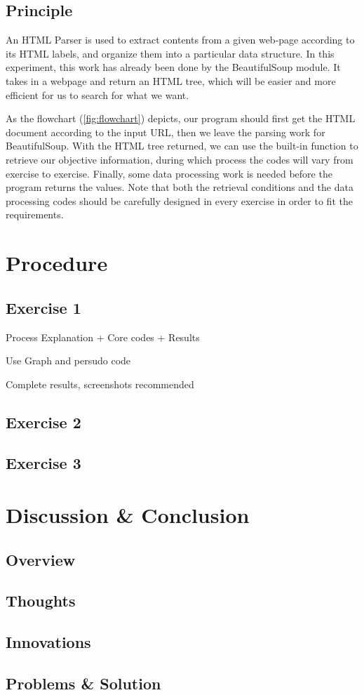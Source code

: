 \documentclass{article}
\begin{document}
\subsection{Principle}
An HTML Parser is used to extract contents from a given web-page according to its HTML labels, and organize them into a particular data structure. In this experiment, this work has already been done by the BeautifulSoup module. It takes in a webpage and return an HTML tree, which will be easier and more efficient for us to search for what we want.

As the flowchart (\ref{fig:flowchart}) depicts,  our program should first get the HTML document according to the input URL, then we leave the parsing work for BeautifulSoup. With the HTML tree returned, we can use the built-in function to retrieve our objective information, during which process the codes will vary from exercise to exercise. Finally, some data processing work is needed before the program returns the values. Note that both the retrieval conditions and the data processing codes should be carefully designed in every exercise in order to fit the requirements.



\section{Procedure}
\subsection{Exercise 1}

Process Explanation + Core codes + Results

Use Graph and persudo code

Complete results, screenshots recommended

\subsection{Exercise 2}
\subsection{Exercise 3}

\section{Discussion \& Conclusion}
\subsection{Overview}
\subsection{Thoughts}
\subsection{Innovations}
\subsection{Problems \& Solution}
\end{document}
